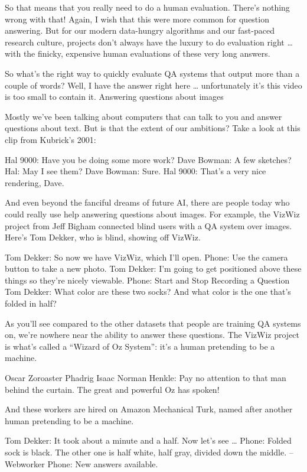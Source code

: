 So that means that you really need to do a human evaluation.  There’s nothing wrong with that!  Again, I wish that this were more common for question answering.  But for our modern data-hungry algorithms and our fast-paced research culture, projects don’t always have the luxury to do evaluation right … with the finicky, expensive human evaluations of these very long answers.

So what’s the right way to quickly evaluate QA systems that output more than a couple of words?  Well, I have the answer right here … unfortunately it’s this video is too small to contain it.
Answering questions about images


Mostly we’ve been talking about computers that can talk to you and answer questions about text.  But is that the extent of our ambitions?  Take a look at this clip from Kubrick’s 2001:

Hal 9000: Have you be doing some more work?
Dave Bowman: A few sketches?
Hal: May I see them?
Dave Bowman: Sure.
Hal 9000: That’s a very nice rendering, Dave.

And even beyond the fanciful dreams of future AI, there are people today who could really use help answering questions about images.  For example, the VizWiz project from Jeff Bigham connected blind users with a QA system over images.  Here’s Tom Dekker, who is blind, showing off VizWiz.

Tom Dekker: So now we have VizWiz, which I’ll open.
Phone: Use the camera button to take a new photo.
Tom Dekker: I’m going to get positioned above these things so they’re nicely viewable.
Phone: Start and Stop Recording a Question
Tom Dekker: What color are these two socks?  And what color is the one that’s folded in half?

As you’ll see compared to the other datasets that people are training QA systems on, we’re nowhere near the ability to answer these questions.  The VizWiz project is what’s called a “Wizard of Oz System”: it’s a human pretending to be a machine.

Oscar Zoroaster Phadrig Isaac Norman Henkle: Pay no attention to that man behind the curtain.  The great and powerful Oz has spoken!

And these workers are hired on Amazon Mechanical Turk, named after another human pretending to be a machine.

Tom Dekker: It took about a minute and a half.  Now let’s see …
Phone: Folded sock is black.  The other one is half white, half gray, divided down the middle.  –Webworker
Phone: New answers available.

